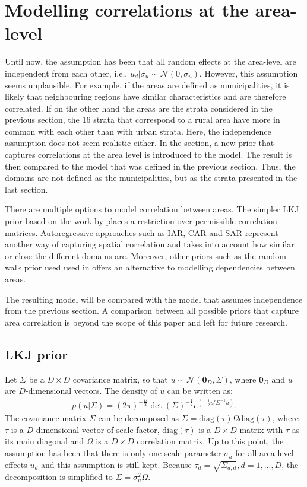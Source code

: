 \section{Modelling correlations at the area-level}
\label{ch:area_corr}

Until now, the assumption has been that all random effects at the area-level are independent from each other, i.e., $u_d|\sigma_u \sim \mathcal N (0, \sigma_u)$.
However, this assumption seems unplausible.
For example, if the areas are defined as municipalities, it is likely that neighbouring regions have similar characteristics and are therefore correlated.
If on the other hand the areas are the strata considered in the previous section, the 16 strata that correspond to a rural area have more in common with each other than with urban strata.
Here, the independence assumption does not seem realistic either.
In the section, a new prior that captures correlations at the area level is introduced to the model.
The result is then compared to the model that was defined in the previous section.
Thus, the domains are not defined as the municipalities, but as the strata presented in the last section.

There are multiple options to model correlation between areas.
The simpler LKJ prior based on the work by \cite{lewandowski_generating_2009} places a restriction over permissible correlation matrices.
Autoregressive approaches such as IAR, CAR and SAR \citep{chung_bayesian_2020} represent another way of capturing spatial correlation and takes into account how similar or close the different domains are.
Moreover, other priors such as the random walk prior used used in \cite{gao_improving_2021} offers an alternative to modelling dependencies between areas.

The resulting model will be compared with the model that assumes independence from the previous section.
A comparison between all possible priors that capture area correlation is beyond the scope of this paper and left for future research.

\subsection{LKJ prior}

Let $\Sigma$ be a $D \times D$ covariance matrix, so that $u \sim \mathcal{N}(\boldsymbol{0}_D, \Sigma)$, where $\boldsymbol 0_D$ and $u$ are $D$-dimensional vectors.
The density of $u$ can be written as:
\begin{gather*}
    p(u|\Sigma) = (2\pi)^{-\frac D 2}\det(\Sigma)^{-\frac 1 2} e^{(-\frac 1 2 u'\Sigma^{-1} u)}.
\end{gather*}
The covariance matrix $\Sigma$ can be decomposed as $\Sigma = \text{diag}(\tau)\Omega\text{diag}(\tau)$, where $\tau$ is a $D$-dimensional vector of scale factor, $\text{diag}(\tau)$ is a $D \times D$ matrix with $\tau$ as its main diagonal and $\Omega$ is a $D \times D$ correlation matrix.
Up to this point, the assumption has been that there is only one scale parameter $\sigma_u$ for all area-level effects $u_d$ and this assumption is still kept.
Because $\tau_d = \sqrt{\Sigma_{d, d}}, d = 1, ..., D$, the decomposition is simplified to $\Sigma = \sigma_u^2 \Omega$.

